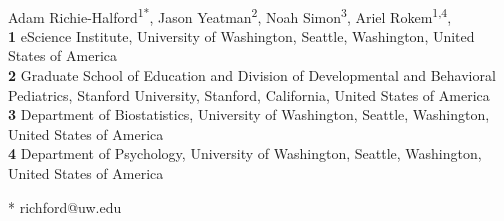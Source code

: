 \documentclass[10pt,letterpaper]{article}
\begin{document}
\vspace*{0.2in}

\begin{flushleft}
{\Large
\textbf{} %
}
\newline
\\
Adam Richie-Halford\textsuperscript{1*},
Jason Yeatman\textsuperscript{2},
Noah Simon\textsuperscript{3},
Ariel Rokem\textsuperscript{1,4},
\\
\bigskip
\textbf{1} eScience Institute, University of Washington, Seattle, Washington, United States of America
\\
\textbf{2} Graduate School of Education and Division of Developmental and Behavioral Pediatrics, Stanford University, Stanford, California, United States of America
\\
\textbf{3} Department of Biostatistics, University of Washington, Seattle, Washington, United States of America
\\
\textbf{4} Department of Psychology, University of Washington, Seattle, Washington, United States of America
\\
\bigskip

* richford@uw.edu

\end{flushleft}

\newcommand*{\alsLRatio}{$0.21$}
\newcommand*{\whLRatio}{$0.83$}
\newcommand*{\hbnLRatio}{$0.67$}
\newcommand*{\ccLRatio}{$0.68$}
\newcommand*{\alsLRatioGpca}{$0.4$}
\newcommand*{\whLRatioGpca}{$0.94$}
\newcommand*{\hbnLRatioGpca}{$0.82$}
\newcommand*{\ccLRatioGpca}{$0.8$}
\newcommand*{\alsAccuracy}{$83$}
\newcommand*{\alsRocAuc}{$0.88$}
\newcommand*{\alsAccuracyGpca}{$88$}
\newcommand*{\alsRocAucGpca}{$0.9$}
\newcommand*{\whRsq}{$0.52$}
\newcommand*{\whMae}{$2.67$}
\newcommand*{\hbnRsq}{$0.57$}
\newcommand*{\hbnMae}{$1.45$}
\newcommand*{\camcanRsq}{$0.77$}
\newcommand*{\camcanMae}{$6.02$}
\newcommand*{\whgpcaRsq}{$0.51$}
\newcommand*{\whgpcaMae}{$3.13$}
\newcommand*{\hbngpcaRsq}{$0.41$}
\newcommand*{\hbngpcaMae}{$1.61$}
\newcommand*{\camcangpcaRsq}{$0.68$}
\newcommand*{\camcangpcaMae}{$7.82$}
\end{document}
